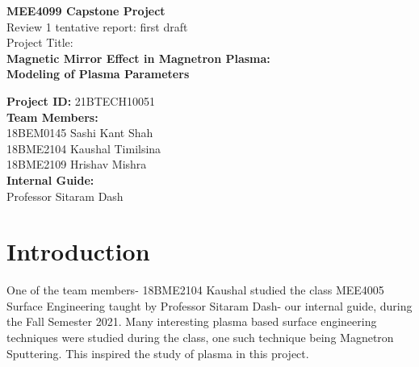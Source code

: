 \documentclass[12pt]{article}
\begin{document}
	
	\selectfont 
		\begin{center}
			\large{\textbf{MEE4099 Capstone Project}} \\ 
			\normalsize{Review 1 tentative report: first draft} \\
			\normalsize{Project Title:} \\ 
			\Large{\textbf{Magnetic Mirror Effect in Magnetron Plasma:}} \\
			\Large{\textbf{Modeling of Plasma Parameters}} \\
		\end{center}
	\textbf{Project ID:} 21BTECH10051 \\
	\textbf{Team Members:} \\
	18BEM0145 Sashi Kant Shah \\
	18BME2104 Kaushal Timilsina \\
	18BME2109 Hrishav Mishra \\
	
	\noindent \textbf{Internal Guide:} \\
	Professor Sitaram Dash
	
	\tableofcontents
	\newpage
	
	\section{Introduction}
	One of the team members- 18BME2104 Kaushal studied the class MEE4005 Surface Engineering taught by Professor Sitaram Dash- our internal guide, during the Fall Semester 2021. Many interesting plasma based surface engineering techniques were studied during the class, one such technique being Magnetron Sputtering. This inspired the study of plasma in this project.
	
\end{document}
